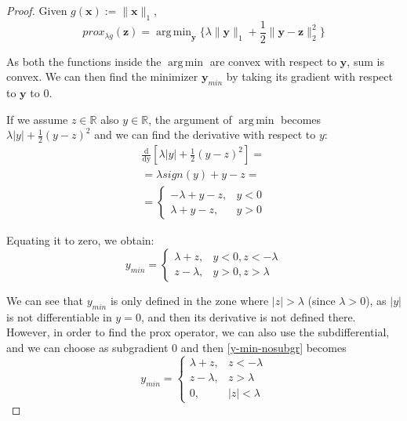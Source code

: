 \documentclass[12pt]{article}
\DeclareMathOperator*{\argmin}{arg\,min}
\begin{document}
\begin{proof}
Given $g(\mathbf{x}) := \lVert \mathbf{x} \rVert_1$,
\begin{equation}
    prox_{\lambda g}(\mathbf{z}) = \argmin_{\mathbf{y}} \{\lambda \lVert \mathbf{y} \rVert_1 + \frac{1}{2} \lVert \mathbf{y} - \mathbf{z} \rVert_2^2 \}
\end{equation}

As both the functions inside the $\argmin$ are convex with respect to $\mathbf{y}$, sum is convex. We can then find the minimizer $\mathbf{y}_{min}$ by taking its gradient with respect to $\mathbf{y}$ to 0.

If we assume $z \in \mathbb{R}$ also $y \in \mathbb{R}$, the argument of $\argmin$ becomes $\lambda |y| + \frac{1}{2} (y - z)^2$ and we can find the derivative with respect to $y$:
\begin{gather}
     \frac{\mathrm{d}}{\mathrm{dy}} [\lambda |y| + \frac{1}{2} (y - z)^2] = \\
     = \lambda sign(y) + y - z = \\
     = \begin{cases}
     - \lambda + y - z, & y < 0 \\
     \lambda + y - z, & y > 0
     \end{cases}
\end{gather}

Equating it to zero, we obtain:
\begin{equation} \label{y-min-nosubgr}
     y_{min} = \begin{cases}
     \lambda + z, & y < 0, z < -\lambda \\
     z - \lambda, & y > 0, z > \lambda
     \end{cases}
\end{equation}

We can see that $y_{min}$ is only defined in the zone where $|z| > \lambda$ (since $\lambda > 0$), as $|y|$ is not differentiable in $y = 0$, and then its derivative is not defined there. However, in order to find the prox operator, we can also use the subdifferential, and we can choose as subgradient $0$ and then \eqref{y-min-nosubgr} becomes
\begin{equation} \label{y-min-subgr}
     y_{min} = \begin{cases}
     \lambda + z,   & z < -\lambda \\
     z - \lambda,   & z > \lambda \\
     0,             & |z| < \lambda 
     \end{cases}
\end{equation}


\end{proof}
\end{document}
